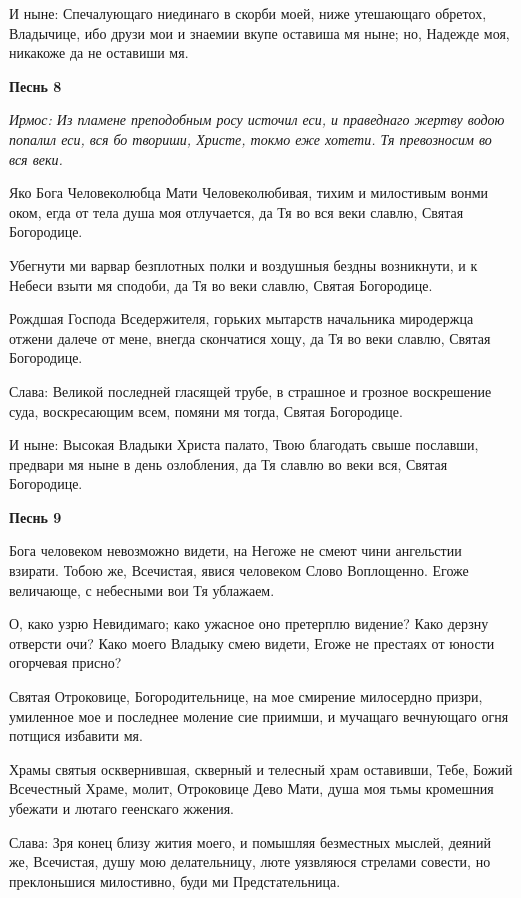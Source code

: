 И ныне: Спечалующаго ниединаго в скорби моей, ниже утешающаго обретох, Владычице, ибо друзи мои и знаемии вкупе оставиша мя ныне; но, Надежде моя, никакоже да не оставиши мя.


\medskip


\bfseries Песнь 8\normalfont{}


\itshape Ирмос:\normalfont{} Из пламене преподобным росу источил еси, и праведнаго жертву водою попалил еси, вся бо твориши, Христе, токмо еже хотети. Тя превозносим во вся веки. 

Яко Бога Человеколюбца Мати Человеколюбивая, тихим и милостивым вонми оком, егда от тела душа моя отлучается, да Тя во вся веки славлю, Святая Богородице. 

Убегнути ми варвар безплотных полки и воздушныя бездны возникнути, и к Небеси взыти мя сподоби, да Тя во веки славлю, Святая Богородице. 

Рождшая Господа Вседержителя, горьких мытарств начальника миродержца отжени далече от мене, внегда скончатися хощу, да Тя во веки славлю, Святая Богородице. 

Слава: Великой последней гласящей трубе, в страшное и грозное воскрешение суда, воскресающим всем, помяни мя тогда, Святая Богородице. 

И ныне: Высокая Владыки Христа палато, Твою благодать свыше пославши, предвари мя ныне в день озлобления, да Тя славлю во веки вся, Святая Богородице.


\medskip


\bfseries Песнь 9\normalfont{}


Бога человеком невозможно видети, на Негоже не смеют чини ангельстии взирати. Тобою же, Всечистая, явися человеком Слово Воплощенно. Егоже величающе, с небесными вои Тя ублажаем. 

О, како узрю Невидимаго; како ужасное оно претерплю видение? Како дерзну отверсти очи? Како моего Владыку смею видети, Егоже не престаях от юности огорчевая присно? 

Святая Отроковице, Богородительнице, на мое смирение милосердно призри, умиленное мое и последнее моление сие приимши, и мучащаго вечнующаго огня потщися избавити мя. 

Храмы святыя осквернившая, скверный и телесный храм оставивши, Тебе, Божий Всечестный Храме, молит, Отроковице Дево Мати, душа моя тьмы кромешния убежати и лютаго геенскаго жжения. 

Слава: Зря конец близу жития моего, и помышляя безместных мыслей, деяний же, Всечистая, душу мою делательницу, люте уязвляюся стрелами совести, но преклоньшися милостивно, буди ми Предстательница. 

